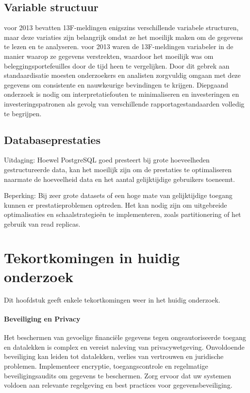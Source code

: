 \subsection{Variable structuur}
voor 2013 bevatten 13F-meldingen enigszins verschillende variabele structuren, maar deze variaties zijn belangrijk omdat ze het moeilijk maken om de gegevens te lezen en te analyseren. voor 2013 waren de 13F-meldingen variabeler in de manier waarop ze gegevens verstrekten, waardoor het moeilijk was om beleggingsportefeuilles door de tijd heen te vergelijken. Door dit gebrek aan standaardisatie moesten onderzoekers en analisten zorgvuldig omgaan met deze gegevens om consistente en nauwkeurige bevindingen te krijgen. Diepgaand onderzoek is nodig om interpretatiefouten te minimaliseren en investeringen en investeringspatronen als gevolg van verschillende rapportagestandaarden volledig te begrijpen.



\subsection{Databaseprestaties}
Uitdaging: Hoewel PostgreSQL goed presteert bij grote hoeveelheden gestructureerde data, kan het moeilijk zijn om de prestaties te optimaliseren naarmate de hoeveelheid data en het aantal gelijktijdige gebruikers toeneemt.

Beperking: Bij zeer grote datasets of een hoge mate van gelijktijdige toegang kunnen er prestatieproblemen optreden. Het kan nodig zijn om uitgebreide optimalisaties en schaalstrategieën te implementeren, zoals partitionering of het gebruik van read replicas.
\section{Tekortkomingen in huidig onderzoek}
Dit hoofdstuk geeft enkele tekortkomingen weer in het huidig onderzoek.

\paragraph{Beveiliging en Privacy}
Het beschermen van gevoelige financiële gegevens tegen ongeautoriseerde toegang en datalekken is complex en vereist naleving van privacywetgeving. Onvoldoende beveiliging kan leiden tot datalekken, verlies van vertrouwen en juridische problemen. Implementeer encryptie, toegangscontrole en regelmatige beveiligingsaudits om gegevens te beschermen. Zorg ervoor dat uw systemen voldoen aan relevante regelgeving en best practices voor gegevensbeveiliging.

